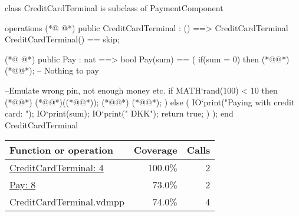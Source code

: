 \begin{vdmpp}
class CreditCardTerminal is subclass of PaymentComponent

operations
(*@
\label{CreditCardTerminal:4}
@*)
 public CreditCardTerminal : () ==> CreditCardTerminal
 CreditCardTerminal() ==
  skip;
  
(*@
\label{Pay:8}
@*)
 public Pay : nat ==> bool
 Pay(sum) ==
 (
  if(sum = 0) then
   (*@@*) (*@@*); -- Nothing to pay
   
 --Emulate wrong pin, not enough money etc.
  if MATH`rand(100) < 10 then 
  (*@\vdmnotcovered{(}@*)
   (*@@*)((*@@*));
   (*@@*) (*@@*);
  ) else 
  (  
   IO`print("Paying with credit card: ");
   IO`print(sum);
   IO`print(" DKK\n");
   return true;
  )
 );
end CreditCardTerminal
\end{vdmpp}
\bigskip
\begin{longtable}{|l|r|r|}
\hline
Function or operation & Coverage & Calls \\
\hline
\hline
\hyperref[CreditCardTerminal:4]{CreditCardTerminal: 4} & 100.0\% & 2 \\
\hline
\hyperref[Pay:8]{Pay: 8} & 73.0\% & 2 \\
\hline
\hline
CreditCardTerminal.vdmpp & 74.0\% & 4 \\
\hline
\end{longtable}

